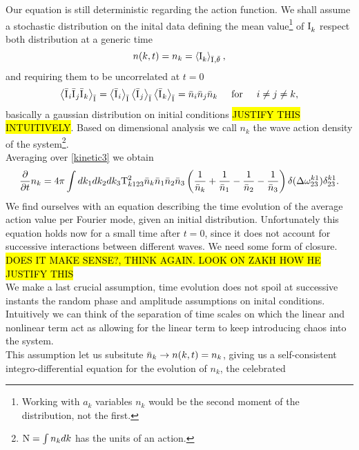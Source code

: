 Our equation is still deterministic regarding the action function. We shall assume a stochastic distribution on the inital data defining 
the mean value\footnote{Working with $a_k$ variables $n_k$ would be the second moment of the distribution, not the first.}
of $\mathrm{I}^{}_k$ respect both distribution at a generic time
\begin{equation}
    n(k,t) = n_k = \left\langle \mathrm{I}^{}_k \right\rangle_{\bar{\mathrm{I}^{}}, \bar{\theta}^{}},
\end{equation}     
and requiring them to be uncorrelated at $t=0$ \\
\begin{equation}
    \left\langle \bar{\mathrm{I}^{}}_i \bar{\mathrm{I}^{}}_j \bar{\mathrm{I}^{}}_k\right\rangle_{\bar{\mathrm{I}^{}}} = 
    \left\langle\bar{\mathrm{I}^{}}_i \right\rangle_{\bar{\mathrm{I}^{}}} \left\langle \bar{\mathrm{I}^{}}_j \right\rangle_{\bar{\mathrm{I}^{}}} \left\langle \bar{\mathrm{I}^{}}_k \right\rangle_{\bar{\mathrm{I}^{}}}
    = \bar{n}_i \bar{n}_j \bar{n}_k \hspace{5mm} \text{for} \hspace{5mm} i\neq j\neq k, 
\end{equation}
basically a gaussian distribution on initial conditions \hl{JUSTIFY THIS INTUITIVELY}. Based on dimensional analysis we call 
$n_k$ the wave action density of the system\footnote{$\mathrm{N} = \int n_k dk$ has the units of an action.}.\\
Averaging over \eqref{kinetic3} we obtain
\begin{equation}
    \frac{\partial}{\partial t} n_k = 4 \pi\int dk_1 dk_2 dk_3 \\
    \mathrm{T}^2_{k123}\bar{n}_k\bar{n}_1\bar{n}_2\bar{n}_3
    \left(\frac{1}{\bar{n}_k} + \frac{1}{\bar{n}_1} - \frac{1}{\bar{n}_2}- \frac{1}{\bar{n}_3}  \right)
    \delta(\Delta{\omega}^{k1}_{23})\delta^{k1}_{23}.
    \label{kinetic4}
\end{equation}
We find ourselves with an equation describing the time evolution of the average action value per Fourier mode, given an initial distribution.
Unfortunately this equation holds now for a small time after $t=0$, 
since it does not account for successive interactions between different waves. We need some form of closure. \hl{DOES IT MAKE SENSE?, THINK AGAIN. LOOK ON ZAKH HOW HE JUSTIFY THIS}\\ 
We make a last crucial assumption, time evolution does not spoil at successive instants the random phase and amplitude 
assumptions on inital conditions. Intuitively we can think of the separation of time scales on which the linear and nonlinear term act as allowing for 
the linear term to keep introducing chaos into the system. \\
This assumption let us subsitute $\bar{n}_k \rightarrow n(k,t) = n_k$, giving us a self-consistent integro-differential equation for the evolution of $n_k$, the celebrated
